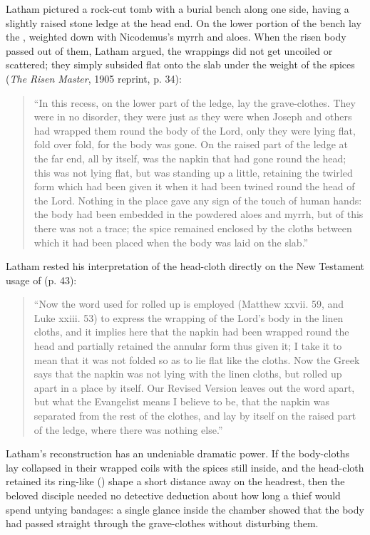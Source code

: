 Latham pictured a rock-cut tomb with a burial bench along one side, having a slightly raised stone ledge at the head end. On the lower portion of the bench lay the , weighted down with Nicodemus's myrrh and aloes. When the risen body passed out of them, Latham argued, the wrappings did not get uncoiled or scattered; they simply subsided flat onto the slab under the weight of the spices (\emph{The Risen Master}, 1905 reprint, p. 34):
\begin{quote}
``In this recess, on the lower part of the ledge, lay the grave-clothes. They were in no disorder, they were just as they were when Joseph and others had wrapped them round the body of the Lord, only they were lying flat, fold over fold, for the body was gone. On the raised part of the ledge at the far end, all by itself, was the napkin that had gone round the head; this was not lying flat, but was standing up a little, retaining the twirled form which had been given it when it had been twined round the head of the Lord. Nothing in the place gave any sign of the touch of human hands: the body had been embedded in the powdered aloes and myrrh, but of this there was not a trace; the spice remained enclosed by the cloths between which it had been placed when the body was laid on the slab.''
\end{quote}

Latham rested his interpretation of the head-cloth directly on the New Testament usage of  (p. 43):
\begin{quote}
``Now the word used for rolled up is employed (Matthew xxvii. 59, and Luke xxiii. 53) to express the wrapping of the Lord's body in the linen cloths, and it implies here that the napkin had been wrapped round the head and partially retained the annular form thus given it; I take it to mean that it was not folded so as to lie flat like the cloths. Now the Greek says that the napkin was not lying with the linen cloths, but rolled up apart in a place by itself. Our Revised Version leaves out the word apart, but what the Evangelist means I believe to be, that the napkin was separated from the rest of the clothes, and lay by itself on the raised part of the ledge, where there was nothing else.''
\end{quote}

Latham's reconstruction has an undeniable dramatic power. If the body-cloths lay collapsed in their wrapped coils with the spices still inside, and the head-cloth retained its ring-like () shape a short distance away on the headrest, then the beloved disciple needed no detective deduction about how long a thief would spend untying bandages: a single glance inside the chamber showed that the body had passed straight through the grave-clothes without disturbing them.

